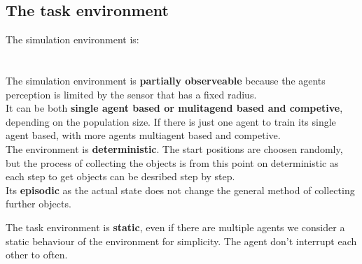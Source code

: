 \documentclass[10pt,a4paper,DIV=11]{scrreprt}
\begin{document}
\subsection{The task environment}
The simulation environment is: \\

   \\
\\

The simulation environment is \textbf{partially observeable} because the agents perception is limited by the sensor that has a fixed radius. \\

It can be both \textbf{single agent based or mulitagend based and competive}, depending on the population size. If there is just one agent to train its single agent based, with more agents multiagent based and competive. \\

The environment is \textbf{deterministic}. The start positions are choosen randomly, but the process of collecting the objects is from this point on deterministic as each step to get objects can be desribed step by step. \\

Its \textbf{episodic} as the actual state does not change the general method of collecting further objects.

The task environment is \textbf{static}, even if there are multiple agents we consider a static behaviour of the environment for simplicity. The agent don't interrupt each other to often. \\
\end{document}

